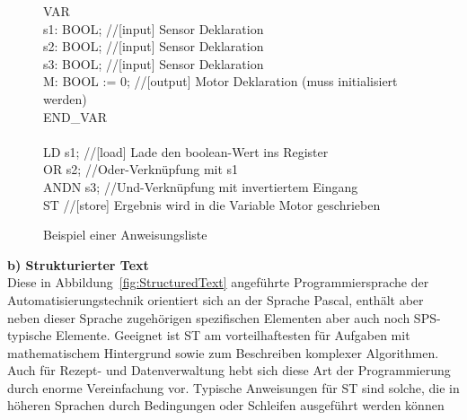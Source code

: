 	\begin{figure}[h!]
		\begin{framed}
			VAR\\
			s1: BOOL; \color{gray}//[input] Sensor Deklaration\\ \color{black}
			s2: BOOL; \color{gray}//[input] Sensor Deklaration\\ \color{black}
			s3: BOOL; \color{gray}//[input] Sensor Deklaration\\ \color{black}
			M: BOOL := 0; \color{gray}//[output] Motor Deklaration (muss initialisiert werden)\\ \color{black}
			END\_VAR\\\\
			LD s1; \color{gray}//[load] Lade den boolean-Wert ins Register\\ \color{black}
			OR s2; \color{gray}//Oder-Verknüpfung mit s1\\ \color{black}
			ANDN s3; \color{gray}//Und-Verknüpfung mit invertiertem Eingang\\ \color{black}
			ST \color{gray}//[store] Ergebnis wird in die Variable Motor geschrieben\\
		\end{framed}
		\caption{Beispiel einer Anweisungsliste}
		\label{fig:Anweisungsliste}
	\end{figure}
	
	\color{black}
	\textbf{b) Strukturierter Text}\\
	
	Diese in Abbildung~\ref{fig:StructuredText} angeführte Programmiersprache der Automatisierungstechnik orientiert sich an der Sprache Pascal, enthält aber neben dieser Sprache zugehörigen spezifischen Elementen aber auch noch SPS-typische Elemente. Geeignet ist ST am vorteilhaftesten für Aufgaben mit mathematischem Hintergrund sowie zum Beschreiben komplexer Algorithmen. Auch für Rezept- und Datenverwaltung hebt sich diese Art der Programmierung durch enorme Vereinfachung vor. Typische Anweisungen für ST sind solche, die in höheren Sprachen durch Bedingungen oder Schleifen ausgeführt werden können \cite{grundlagen_automatisierungstechnik}
	

